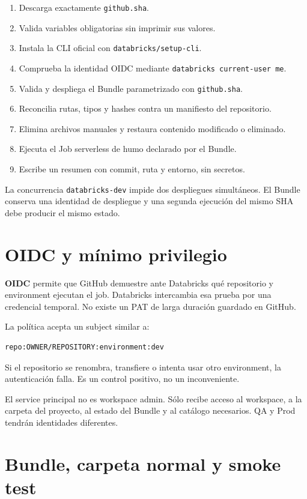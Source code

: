\documentclass[11pt,a4paper]{article}
\newcommand{\concepto}[1]{\textcolor{dbblue}{\textbf{#1}}}
\begin{document}
\begin{enumerate}
  \item Descarga exactamente \texttt{github.sha}.
  \item Valida variables obligatorias sin imprimir sus valores.
  \item Instala la CLI oficial con \texttt{databricks/setup-cli}.
  \item Comprueba la identidad OIDC mediante \texttt{databricks current-user me}.
  \item Valida y despliega el Bundle parametrizado con \texttt{github.sha}.
  \item Reconcilia rutas, tipos y hashes contra un manifiesto del repositorio.
  \item Elimina archivos manuales y restaura contenido modificado o eliminado.
  \item Ejecuta el Job serverless de humo declarado por el Bundle.
  \item Escribe un resumen con commit, ruta y entorno, sin secretos.
\end{enumerate}

La concurrencia \texttt{databricks-dev} impide dos despliegues simultáneos. El Bundle conserva una
identidad de despliegue y una segunda ejecución del mismo SHA debe producir el mismo estado.

\section{OIDC y mínimo privilegio}

\concepto{OIDC} permite que GitHub demuestre ante Databricks qué repositorio y environment ejecutan el
job. Databricks intercambia esa prueba por una credencial temporal. No existe un PAT de larga duración
guardado en GitHub.

La política acepta un subject similar a:

\begin{lstlisting}
repo:OWNER/REPOSITORY:environment:dev
\end{lstlisting}

Si el repositorio se renombra, transfiere o intenta usar otro environment, la autenticación falla. Es
un control positivo, no un inconveniente.

El service principal no es workspace admin. Sólo recibe acceso al workspace, a la carpeta del
proyecto, al estado del Bundle y al catálogo necesarios. QA y Prod tendrán identidades diferentes.

\section{Bundle, carpeta normal y smoke test}
\end{document}
